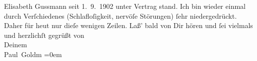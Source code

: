 \begin{ledgroupsized}[t]{13cm}
{{{                     Elisabeth Gussmann seit 1. 9. 1902 unter Vertrag stand}}}\label{K_L03229-11h}.\pend
           \pstart
           Ich bin wieder einmal durch Verſchiedenes (Schlafloſigkeit, nervöſe Störungen) ſehr
                  {\pb}niedergedrückt. Daher für heut nur dieſe wenigen Zeilen.\pend
           \pstart
           Laß’ bald von Dir hören und ſei vielmals und herzlichſt gegrüßt von {\\[\baselineskip]}Deinem {\\[\baselineskip]}\spacefill\mbox{Paul Goldm}\pend
           \leftskip=0em{}
         
         \endnumbering{}\end{ledgroupsized}  \newcommand{\dateiname}{L03229}\newcommand{\titel}{Paul Goldmann an Arthur Schnitzler, 10. 11. [1902]}\newcommand{\editorInnen}{Martin Anton Müller und Laura Untner}
      